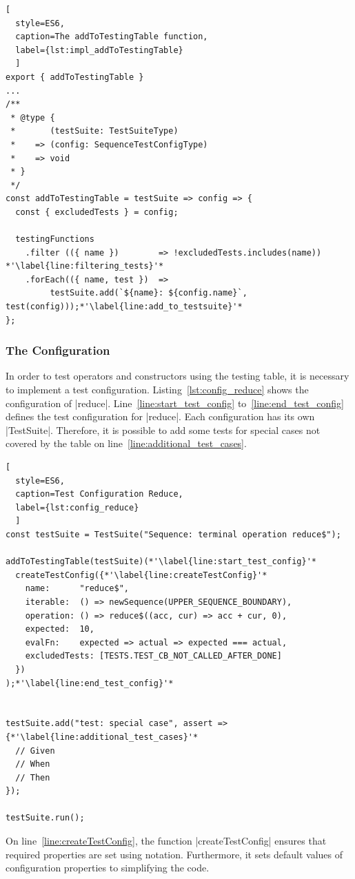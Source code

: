 \begin{lstlisting}[
  style=ES6, 
  caption=The addToTestingTable function,
  label={lst:impl_addToTestingTable}
  ]
export { addToTestingTable }
...
/**
 * @type {
 *       (testSuite: TestSuiteType)
 *    => (config: SequenceTestConfigType)
 *    => void
 * }
 */
const addToTestingTable = testSuite => config => {
  const { excludedTests } = config;

  testingFunctions
    .filter (({ name })        => !excludedTests.includes(name)) *'\label{line:filtering_tests}'*
    .forEach(({ name, test })  => 
         testSuite.add(`${name}: ${config.name}`, test(config)));*'\label{line:add_to_testsuite}'*
};
\end{lstlisting}

\subsubsection{The Configuration}
\label{subsub:The Configuration}

In order to test operators and constructors using the testing table, it is
necessary to implement a test configuration.
Listing~\ref{lst:config_reduce} shows the configuration of |reduce|. 
Line~\ref{line:start_test_config} to~\ref{line:end_test_config} defines the test 
configuration for |reduce|. Each configuration has its own |TestSuite|. Therefore, it is possible to add
some tests for special cases not covered by the table on line~\ref{line:additional_test_cases}.


\begin{lstlisting}[
  style=ES6, 
  caption=Test Configuration Reduce,
  label={lst:config_reduce}
  ]
const testSuite = TestSuite("Sequence: terminal operation reduce$");

addToTestingTable(testSuite)(*'\label{line:start_test_config}'*
  createTestConfig({*'\label{line:createTestConfig}'*
    name:      "reduce$",
    iterable:  () => newSequence(UPPER_SEQUENCE_BOUNDARY),
    operation: () => reduce$((acc, cur) => acc + cur, 0),
    expected:  10,
    evalFn:    expected => actual => expected === actual,
    excludedTests: [TESTS.TEST_CB_NOT_CALLED_AFTER_DONE]
  })
);*'\label{line:end_test_config}'*


testSuite.add("test: special case", assert => {*'\label{line:additional_test_cases}'*
  // Given
  // When
  // Then
});

testSuite.run();
\end{lstlisting}

On line~\ref{line:createTestConfig}, the function |createTestConfig| ensures
that required properties are set using notation. Furthermore, it sets default
values of configuration properties to simplifying the code.

